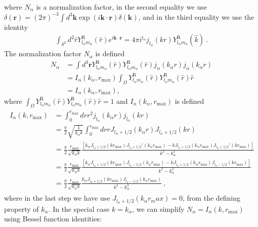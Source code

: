 \documentclass[a4paper,11pt]{article}
\newcommand{\sph}[2]{Y^\text{R}_{l_#1 m_#1}(\hat{#2})}
\newcommand{\jl}[1]{j_{l_#1}}
\begin{document}
where $N_\alpha$ is a normalization factor, in the second equality we use $\delta(\mathbf{r})=(2\pi)^{-3} \int d^3 \mathbf{k} \exp(i \mathbf{k} \cdot \mathbf{r}) \delta(\mathbf{k})$, and in the third equality we use the identity
\begin{align} 
\int_{S^2} d^2 \hat{r} \sph{\alpha}{r} e^{i \mathbf{k} \cdot \mathbf{r}} = 4 \pi i^{l_\alpha} j_{l_\alpha}(k r)\sph{\alpha}{k}~. 
\end{align}
The normalization factor $N_\alpha$ is defined
\begin{align}\label{normalization}
N_\alpha&=\int{d^3\mathbf{r}\sph{\alpha}{r} \sph{\alpha}{r} j_\alpha(k_\alpha r) j_\alpha(k_\alpha r)} \\
&=  I_\alpha(k_\alpha, r_{\text{max}})  \int_\Omega \sph{\alpha}{r} \sph{\alpha}{r} \hat{r}\\
& =I_\alpha(k_\alpha, r_{\text{max}}),
\end{align}
where $ \int_\Omega \sph{\alpha}{r} \sph{\alpha}{r} \hat{r}=1$ and $ I_\alpha(k_\alpha, r_{\text{max}}) $ is defined
\begin{align}\label{i_alpha}
\begin{split} 
I_\alpha(k,  r_\text{max}) & =  \int_0^{r_\text{max}}dr r^2 \jl{\alpha}(k_\alpha r) \jl{\alpha}( k r) \\
& = \frac{\pi}{2} \sqrt{ \frac{1}{k _ \alpha k}} \int_0^{r_\text{max}}dr r J_{l_\alpha+ 1/2}(k_\alpha r)  J_{l_\alpha+ 1/2}( k r) \\
& = \frac{\pi}{2} \frac{ r_\text{max}}{ \sqrt{ k _ \alpha k}}\frac{\left[k_\alpha J_{l_\alpha+ 1/2}( k  r_\text{max})J_{l_\alpha+ 1/2}'(k_\alpha  r_\text{max}) - k J_{l_\alpha+ 1/2}(k_\alpha  r_\text{max})J_{l_\alpha+ 1/2}'(k  r_\text{max})\right]}{k^2 - k_\alpha^2}\\
& = \frac{\pi}{2} \frac{ r_\text{max}}{ \sqrt{ k _ \alpha k}}\frac{\left[k_\alpha J_{l_\alpha+ 1/2}( k  r_\text{max})J_{l_\alpha- 1/2}(k_\alpha  r_\text{max}) - k J_{l_\alpha+ 1/2}(k_\alpha  r_\text{max})J_{l_\alpha- 1/2}(k  r_\text{max})\right]}{k^2 - k_\alpha^2}\\
& = \frac{\pi}{2} \frac{ r_\text{max}}{ \sqrt{ k _ \alpha k}}\frac{k_\alpha J_{l_\alpha+ 1/2}( k  r_{\text{max}})J_{l_\alpha- 1/2}(k_\alpha  r_\text{max})}{k^2 - k_\alpha^2}~,
\end{split} 
\end{align}
where in the last step we have use $J_{l_\alpha+1/2}(k_\alpha r_max)=0$, from the defining property of $k_\alpha$. In the special case $k=k_\alpha$, we can simplify $N_\alpha = I_\alpha(k,r_\text{max})$ using Bessel function identities:
\end{document}
